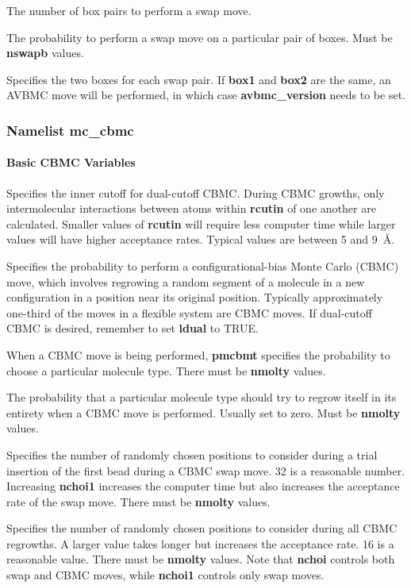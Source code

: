 \documentclass[12pt,letterpaper]{article}
\begin{document}
 The number of box pairs to perform a
swap move.

 The probability to perform a swap
move on a particular pair of boxes. Must be {\bf nswapb}
values.

 Specifies the two boxes for each
swap pair. If {\bf box1} and {\bf box2} are the same, an
AVBMC move will be performed, in which case
\textbf{avbmc\_version} needs to be set.

\subsubsection{Namelist \textbf{mc\_cbmc}}
\paragraph{Basic CBMC Variables}

 Specifies the inner cutoff for
dual-cutoff CBMC. During CBMC growths, only intermolecular
interactions between atoms within {\bf rcutin} of one
another are calculated. Smaller values of {\bf rcutin} will
require less computer time while larger values will have
higher acceptance rates. Typical values are between 5 and
9~\AA.

 Specifies the probability to perform a
configurational-bias Monte Carlo (CBMC) move, which involves
regrowing a random segment of a molecule in a new
configuration in a position near its original position.
Typically approximately one-third of the moves in a flexible
system are CBMC moves. If dual-cutoff CBMC is desired,
remember to set {\bf ldual} to TRUE.

 When a CBMC move is being performed,
{\bf pmcbmt} specifies the probability to choose a particular
molecule type. There must be {\bf nmolty} values.

 The probability that a particular
molecule type should try to regrow itself in its entirety
when a CBMC move is performed. Usually set to zero. Must be
{\bf nmolty} values.

 Specifies the number of randomly
chosen positions to consider during a trial insertion of the
first bead during a CBMC swap move. 32 is a reasonable
number. Increasing {\bf nchoi1} increases the computer time
but also increases the acceptance rate of the swap move.
There must be {\bf nmolty} values.

 Specifies the number of randomly
chosen positions to consider during all CBMC regrowths. A
larger value takes longer but increases the acceptance rate.
16 is a reasonable value. There must be {\bf nmolty} values.
Note that {\bf nchoi} controls both swap and CBMC moves,
while {\bf nchoi1} controls only swap moves.
\end{document}
